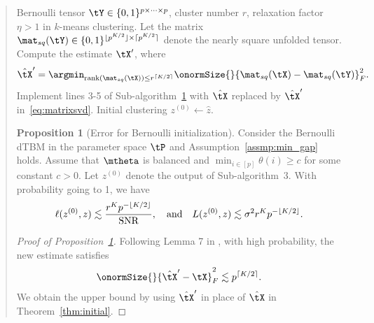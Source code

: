 \documentclass[11pt]{article}
\theoremstyle{definition}
\newtheorem{prop}{Proposition}
\theoremstyle{definition}
\DeclarePairedDelimiter{\ceil}{\lceil}{\rceil}
\DeclarePairedDelimiter{\floor}{\lfloor}{\rfloor}
\begin{document}
\begin{enumerate}[wide, labelwidth=!, labelindent=0pt]
\begin{enumerate}
\begin{quote}
\begin{algorithm}[h!]
\caption*{\bf Sub-algorithm 3: Weighted higher-order initialization for Bernoulli observation}
\vspace{.15cm}
\begin{algorithmic}[1] 
\INPUT Bernoulli tensor $\tY \in \{0,1\}^{p\times \cdots \times p}$, cluster number $r$, relaxation factor $\eta > 1$ in $k$-means clustering.
\State  Let the matrix $\mat_{sq} (\tY) \in \{0,1\}^{\floor{p^{K/2}} \times \ceil{p^{K/2}} }$ denote the nearly square unfolded tensor. Compute the estimate $\tX'$, where
\begin{equation}\label{eq:matrixsvd}
    \hat \tX' = \argmin_{\text{rank}(\mat_{sq}(\tX)) \leq r^{\ceil{K/2}}} \onormSize{}{ \mat_{sq}(\tX) -  \mat_{sq}(\tY)}_F^2.
\end{equation}
\State Implement lines 3-5 of Sub-algorithm~\hyperref[alg:main]{1} with $\hat \tX$ replaced by $\hat \tX'$ in~\eqref{eq:matrixsvd}.
\OUTPUT Initial clustering $z^{(0)} \leftarrow \hat z$.
\end{algorithmic}
\end{algorithm}

\begin{prop}[Error for Bernoulli initialization]\label{cor:ber} Consider the Bernoulli dTBM in the parameter space $\tP$ and Assumption~\ref{assmp:min_gap} holds. Assume that $\mtheta$ is balanced and $\min_{i\in[p]}\theta(i) \geq c$ for some constant $c>0$. Let $ z^{(0)}$ denote the output of Sub-algorithm~3. With probability going to 1, we have
\begin{equation}\label{eq:ini_b}
 \ell(z^{(0)}, z) \lesssim \frac{r^K p^{- \floor{K/2} }}{\text{SNR}}, \quad \text{and} \quad L(z^{(0)}, z) \lesssim  {\sigma^2 r^K p^{-\floor{K/2}}}.
\end{equation}
\end{prop}

\begin{proof}[Proof of Proposition~\ref{cor:ber}] Following Lemma 7 in \cite{gao2018community}, with high probability, the new estimate satisfies
\begin{equation}
    \onormSize{}{\hat \tX' - \tX}_F^2 \lesssim p^{\ceil{K/2}}.
\end{equation} 
We obtain the upper bound by using $\hat \tX'$ in place of $\hat \tX$  in Theorem~\ref{thm:initial}.
\end{proof}


\end{quote}
\end{enumerate}
\end{enumerate}
\end{document}
